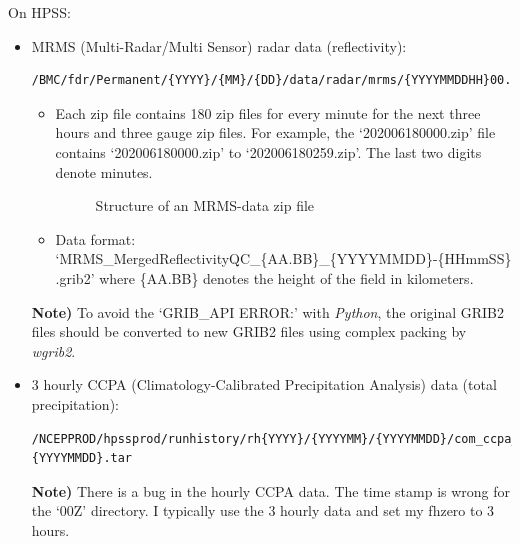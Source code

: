 \documentclass[11pt,fleqn]{report}              %
\begin{document}
On HPSS:
\begin{itemize}
\item MRMS (Multi-Radar/Multi Sensor) radar data (reflectivity): 
\lstset{language=bash}   
\begin{lstlisting}[frame=trBL]
/BMC/fdr/Permanent/{YYYY}/{MM}/{DD}/data/radar/mrms/{YYYYMMDDHH}00.zip
\end{lstlisting}
\begin{itemize}
\item Each zip file contains 180 zip files for every minute for the next three hours and three gauge zip files. For example, the `202006180000.zip' file contains  `202006180000.zip' to `202006180259.zip'. The last two digits denote minutes.
\begin{figure}[ht!]
\centering
\begin{minipage}{0.7\linewidth}
\end{minipage}
\caption{Structure of an MRMS-data zip file}
\label{figure:str_mrms_zip}
\end{figure}

\item Data format: `MRMS\_MergedReflectivityQC\_\{AA.BB\}\_\{YYYYMMDD\}-\{HHmmSS\} .grib2' where \{AA.BB\} denotes the height of the field in kilometers.
\end{itemize}

{\bf Note)} To avoid the `GRIB\_API ERROR:' with {\it Python}, the original GRIB2 files should be converted to new GRIB2 files using complex packing by {\it wgrib2}.

\item 3 hourly CCPA (Climatology-Calibrated Precipitation Analysis) data (total precipitation): 
\lstset{language=bash}   
\begin{lstlisting}[frame=trBL]
/NCEPPROD/hpssprod/runhistory/rh{YYYY}/{YYYYMM}/{YYYYMMDD}/com_ccpa_prod_ccpa.{YYYYMMDD}.tar
\end{lstlisting}

{\bf Note)} There is a bug in the hourly CCPA data. The time stamp is wrong for the `00Z' directory. I typically use the 3 hourly data and set my fhzero to 3 hours.

\end{itemize}
\end{document}
